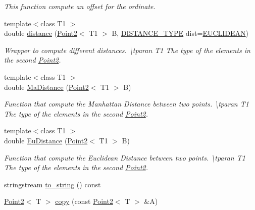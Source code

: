 \begin{DoxyCompactItemize}
\begin{DoxyCompactList}\small\item\em This function compute an offset for the ordinate. \end{DoxyCompactList}\item 
{\footnotesize template$<$class T1 $>$ }\\double \mbox{\hyperlink{class_point2_a5f50f8f110af78415a56b0c32c2c8b8f}{distance}} (\mbox{\hyperlink{class_point2}{Point2}}$<$ T1 $>$ B, \mbox{\hyperlink{maths_8hh_ac50d7263b1cae8691420b86282b27f90}{D\+I\+S\+T\+A\+N\+C\+E\+\_\+\+T\+Y\+PE}} dist=\mbox{\hyperlink{maths_8hh_ac50d7263b1cae8691420b86282b27f90a81bbbc4428c3ff3f1327e94957e2b5f1}{E\+U\+C\+L\+I\+D\+E\+AN}})
\begin{DoxyCompactList}\small\item\em Wrapper to compute different distances. \textbackslash{}tparan T1 The type of the elements in the second {\ttfamily \mbox{\hyperlink{class_point2}{Point2}}}. \end{DoxyCompactList}\item 
{\footnotesize template$<$class T1 $>$ }\\double \mbox{\hyperlink{class_point2_a10a4aa3d7939b1675f4bd18b8f9f0ead}{Ma\+Distance}} (\mbox{\hyperlink{class_point2}{Point2}}$<$ T1 $>$ B)
\begin{DoxyCompactList}\small\item\em Function that compute the Manhattan Distance between two points. \textbackslash{}tparan T1 The type of the elements in the second {\ttfamily \mbox{\hyperlink{class_point2}{Point2}}}. \end{DoxyCompactList}\item 
{\footnotesize template$<$class T1 $>$ }\\double \mbox{\hyperlink{class_point2_aa930b619ed2efeda96b4210ee3b8cb9c}{Eu\+Distance}} (\mbox{\hyperlink{class_point2}{Point2}}$<$ T1 $>$ B)
\begin{DoxyCompactList}\small\item\em Function that compute the Euclidean Distance between two points. \textbackslash{}tparan T1 The type of the elements in the second {\ttfamily \mbox{\hyperlink{class_point2}{Point2}}}. \end{DoxyCompactList}\item 
stringstream \mbox{\hyperlink{class_point2_aa04082290a2f554060081beafd7d7e0d}{to\+\_\+string}} () const
\item 
\mbox{\hyperlink{class_point2}{Point2}}$<$ T $>$ \mbox{\hyperlink{class_point2_abf5cfefe8e75dda02f681fc8d74c2c39}{copy}} (const \mbox{\hyperlink{class_point2}{Point2}}$<$ T $>$ \&A)

\end{DoxyCompactItemize}
